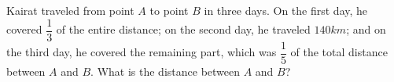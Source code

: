 Kairat traveled from point $A$ to point $B$ in three days. On the first day, he covered $\dfrac{1}{3}$ of the entire distance; on the second day, he traveled $140km$; and on the third day, he covered the remaining part, which was $\dfrac{1}{5}$ of the total distance between $A$ and $B$. What is the distance between $A$ and $B$?
